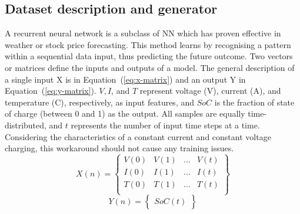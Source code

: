 \subsection{Dataset description and generator} \label{subsec:dataset}
%
A recurrent neural network is a subclass of NN which has proven effective in weather or stock price forecasting.
This method learns by recognising a pattern within a sequential data input, thus predicting the future outcome.
Two vectors or matrices define the inputs and outputs of a model.
The general description of a single input X is in \mbox{Equation~(\ref{eq:x-matrix})} and an output Y in \mbox{Equation~(\ref{eq:y-matrix})}.
$V, I$, and $T$ represent voltage (V), current (A), and temperature (\textdegree{}C), respectively, as input features, and $SoC$ is the fraction of state of charge (between 0 and 1) as the output.
All samples are equally time-distributed, and $t$ represents the number of input time steps at a time.
Considering the characteristics of a constant current and constant voltage charging, this workaround should not cause any training issues.
\begin{equation}
    X \left (n \right ) =
    \begin{Bmatrix}
        V \left (0 \right ) & V \left (1 \right ) & ... & V \left (t \right )\\
        I \left (0 \right ) & I \left (1 \right ) & ... & I \left (t \right )\\
        T \left (0 \right ) & T \left (1 \right ) & ... & T \left (t \right )\\
    \end{Bmatrix}
    \label{eq:x-matrix}
\end{equation}
\begin{equation}
    Y \left (n \right ) =
    \begin{Bmatrix}
        SoC \left (t \right )
    \end{Bmatrix}
    \label{eq:y-matrix}
\end{equation}

